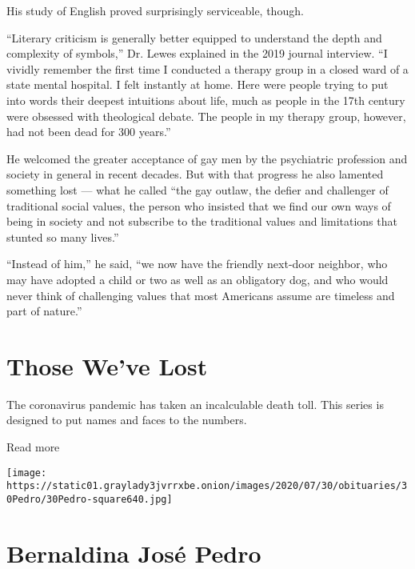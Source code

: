 His study of English proved surprisingly serviceable, though.

``Literary criticism is generally better equipped to understand the
depth and complexity of symbols,'' Dr. Lewes explained in the 2019
journal interview. ``I vividly remember the first time I conducted a
therapy group in a closed ward of a state mental hospital. I felt
instantly at home. Here were people trying to put into words their
deepest intuitions about life, much as people in the 17th century were
obsessed with theological debate. The people in my therapy group,
however, had not been dead for 300 years.''

He welcomed the greater acceptance of gay men by the psychiatric
profession and society in general in recent decades. But with that
progress he also lamented something lost --- what he called ``the gay
outlaw, the defier and challenger of traditional social values, the
person who insisted that we find our own ways of being in society and
not subscribe to the traditional values and limitations that stunted so
many lives.''

``Instead of him,'' he said, ``we now have the friendly next-door
neighbor, who may have adopted a child or two as well as an obligatory
dog, and who would never think of challenging values that most Americans
assume are timeless and part of nature.''

\href{https://www.nytimes3xbfgragh.onion/interactive/2020/obituaries/people-died-coronavirus-obituaries.html?action=click\&pgtype=Article\&state=default\&region=BELOW_MAIN_CONTENT\&context=covid_obits_promo}{}

\hypertarget{those-weve-lost}{%
\section{Those We've Lost}\label{those-weve-lost}}

The coronavirus pandemic has taken an incalculable death toll. This
series is designed to put names and faces to the numbers.

Read more

\texttt{[image: https://static01.graylady3jvrrxbe.onion/images/2020/07/30/obituaries/30Pedro/30Pedro-square640.jpg]}

\hypertarget{bernaldina-josuxe9-pedro}{%
\section{Bernaldina José Pedro}\label{bernaldina-josuxe9-pedro}}

